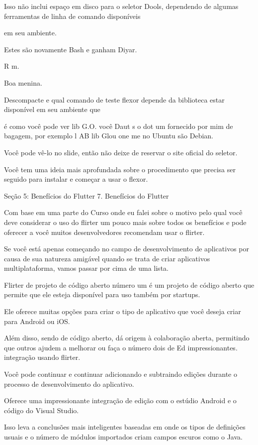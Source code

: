 Isso não inclui espaço em disco para o seletor Dools, dependendo de algumas ferramentas de linha de comando disponíveis

em seu ambiente.

Estes são novamente Bash e ganham Diyar.

R m.

Boa menina.

Descompacte e qual comando de teste flexor depende da biblioteca estar disponível em seu ambiente que

é como você pode ver lib G.O. você Daut s o dot um fornecido por mim de bagagem, por exemplo l AB lib Glou one me no Ubuntu são Debian.

Você pode vê-lo no slide, então não deixe de reservar o site oficial do seletor.

Você tem uma ideia mais aprofundada sobre o procedimento que precisa ser seguido para instalar e começar a usar o flexor.



Seção 5: Benefícios do Flutter
7. Benefícios do Flutter

Com base em uma parte do Curso onde eu falei sobre o motivo pelo qual você deve considerar o uso do flirter um pouco mais sobre todos os benefícios e pode oferecer a você muitos desenvolvedores recomendam usar o flirter.

Se você está apenas começando no campo de desenvolvimento de aplicativos por causa de sua natureza amigável quando se trata de criar aplicativos multiplataforma, vamos passar por cima de uma lista.

Flirter de projeto de código aberto número um é um projeto de código aberto que permite que ele esteja disponível para uso também por startups.

Ele oferece muitas opções para criar o tipo de aplicativo que você deseja criar para Android ou iOS.

Além disso, sendo de código aberto, dá origem à colaboração aberta, permitindo que outros ajudem a melhorar ou faça o número dois de Ed impressionantes. integração usando flirter.

Você pode continuar e continuar adicionando e subtraindo edições durante o processo de desenvolvimento do aplicativo.

Oferece uma impressionante integração de edição com o estúdio Android e o código do Visual Studio.

Isso leva a conclusões mais inteligentes baseadas em onde os tipos de definições usuais e o número de módulos importados criam campos escuros como o Java.

